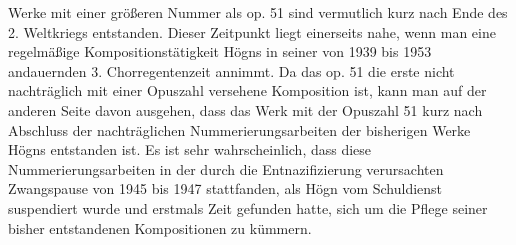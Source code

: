 Werke mit einer größeren Nummer als op. 51 sind vermutlich kurz nach
Ende des 2. Weltkriegs entstanden. Dieser Zeitpunkt liegt einerseits
nahe, wenn man eine regelmäßige Kompositionstätigkeit Högns in seiner
von 1939 bis 1953 andauernden 3. Chorregentenzeit annimmt. Da das op.
51 die erste nicht nachträglich mit einer Opuszahl versehene
Komposition ist, kann man auf der anderen Seite davon ausgehen, dass
das Werk mit der Opuszahl 51 kurz nach Abschluss der nachträglichen
Nummerierungsarbeiten der bisherigen Werke Högns entstanden ist. Es ist
sehr wahrscheinlich, dass diese Nummerierungsarbeiten in der durch die
Entnazifizierung verursachten Zwangspause von 1945 bis 1947
stattfanden, als Högn vom Schuldienst suspendiert wurde und erstmals
Zeit gefunden hatte, sich um die Pflege seiner bisher entstandenen
Kompositionen zu kümmern.









